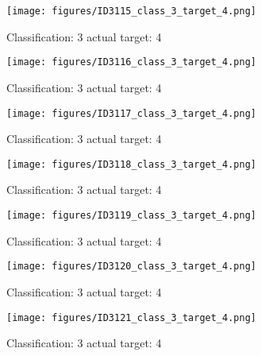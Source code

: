 \begin{figure}[h!]
\begin{center}
\texttt{[image: figures/ID3115\_class\_3\_target\_4.png]}
\end{center}
\caption{ Classification: 3 actual target: 4}
\label{fig:ID3115_class_3_target_4}
\end{figure}
\begin{figure}[h!]
\begin{center}
\texttt{[image: figures/ID3116\_class\_3\_target\_4.png]}
\end{center}
\caption{ Classification: 3 actual target: 4}
\label{fig:ID3116_class_3_target_4}
\end{figure}
\begin{figure}[h!]
\begin{center}
\texttt{[image: figures/ID3117\_class\_3\_target\_4.png]}
\end{center}
\caption{ Classification: 3 actual target: 4}
\label{fig:ID3117_class_3_target_4}
\end{figure}
\begin{figure}[h!]
\begin{center}
\texttt{[image: figures/ID3118\_class\_3\_target\_4.png]}
\end{center}
\caption{ Classification: 3 actual target: 4}
\label{fig:ID3118_class_3_target_4}
\end{figure}
\begin{figure}[h!]
\begin{center}
\texttt{[image: figures/ID3119\_class\_3\_target\_4.png]}
\end{center}
\caption{ Classification: 3 actual target: 4}
\label{fig:ID3119_class_3_target_4}
\end{figure}
\begin{figure}[h!]
\begin{center}
\texttt{[image: figures/ID3120\_class\_3\_target\_4.png]}
\end{center}
\caption{ Classification: 3 actual target: 4}
\label{fig:ID3120_class_3_target_4}
\end{figure}
\begin{figure}[h!]
\begin{center}
\texttt{[image: figures/ID3121\_class\_3\_target\_4.png]}
\end{center}
\caption{ Classification: 3 actual target: 4}
\label{fig:ID3121_class_3_target_4}
\end{figure}
